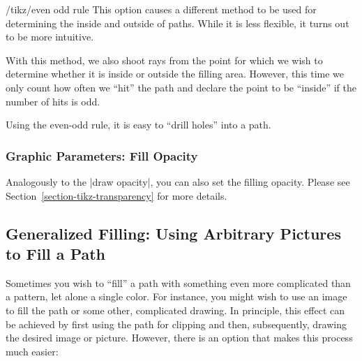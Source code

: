 \begin{key}{/tikz/even odd rule}
  This option causes a different method to be used for determining the
  inside and outside of paths. While it is less flexible, it turns out
  to be more intuitive.

  With this method, we also shoot rays from the point for which we
  wish to determine whether it is inside or outside the filling
  area. However, this time we only count how often we ``hit'' the path
  and declare the point to be ``inside'' if the number of hits is odd.

  Using the even-odd rule, it is easy to ``drill holes'' into a path.

\begin{codeexample}[]
\end{codeexample}
\end{key}



\subsubsection{Graphic Parameters: Fill Opacity}

\label{section-fill-opacity}
Analogously to the |draw opacity|, you can also set the filling
opacity. Please see Section~\ref{section-tikz-transparency} for more
details.


\subsection{Generalized Filling: Using Arbitrary Pictures to Fill a Path}

Sometimes you wish to ``fill'' a path with something even more
complicated than a pattern, let alone a single color. For instance,
you might wish to use an image to fill the path or some other,
complicated drawing. In principle, this effect can be achieved
by first using the path for clipping and then, subsequently, drawing
the desired image or picture. However, there is an option that makes
this process much easier:


